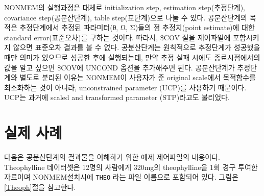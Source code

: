 \documentclass[
  10pt,
  krantz2,
  a4paper]{krantz}
\theoremstyle{definition}
\theoremstyle{definition}
\theoremstyle{definition}
\theoremstyle{remark}
\begin{document}
NONMEM의 실행과정은 대체로 initialization step, estimation step(추정단계), covariance step(공분산단계), table step(표단계)으로 나눌 수 있다. 공분산단계의 목적은 추정단계에서 추정된 파라미터(θ, Ω, Σ)들의 점 추정치(point estimate)에 대한 standard error(표준오차)를 구하는 것이다. 따라서, \$COV 절을 제어파일에 포함시키지 않으면 표준오차 결과를 볼 수 없다. 공분산단계는 원칙적으로 추정단계가 성공했을 때만 의미가 있으므로 성공한 후에 실행되는데, 만약 추정 실패 시에도 종료시점에서의 값을 알고 싶으면 \$COV에 UNCOND 옵션을 추가해주면 된다. 공분산단계가 추정단계와 별도로 분리된 이유는 NONMEM이 사용자가 준 original scale에서 목적함수를 최소화하는 것이 아니라, unconstrained parameter (UCP)를 사용하기 때문이다. UCP는 과거에 scaled and transformed parameter (STP)라고도 불리었다.

\hypertarget{actual-example}{%
\section{실제 사례}\label{actual-example}}

다음은 공분산단계의 결과물을 이해하기 위한 예제 제어파일의 내용이다. Theophylline 데이터셋은 12명의 사람에게 320mg의 theophylline을 1회 경구 투여한 자료이며 NONMEM설치시에 \texttt{THEO} 라는 파일 이름으로 포함되어 있다. 그림은 \ref{Theoph}절을 참고한다.
\end{document}
